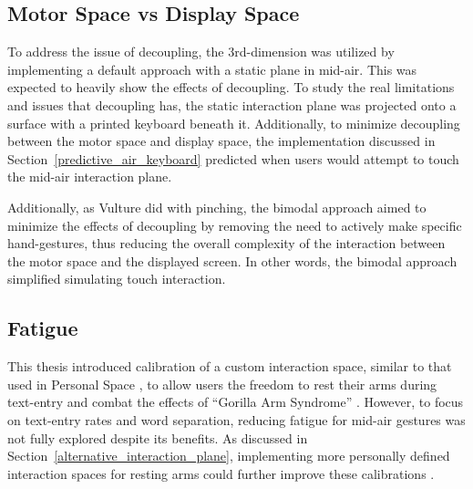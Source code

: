 \subsection{Motor Space vs Display Space}
To address the issue of decoupling, the 3rd-dimension was utilized by implementing a default approach with a static plane in mid-air. This was expected to heavily show the effects of decoupling. To study the real limitations and issues that decoupling has, the static interaction plane was projected onto a surface with a printed keyboard beneath it. Additionally, to minimize decoupling between the motor space and display space, the implementation discussed in Section~\ref{predictive_air_keyboard} predicted when users would attempt to touch the mid-air interaction plane.

Additionally, as Vulture did with pinching, the bimodal approach aimed to minimize the effects of decoupling by removing the need to actively make specific hand-gestures, thus reducing the overall complexity of the interaction between the motor space and the displayed screen. In other words, the bimodal approach simplified simulating touch interaction.

\subsection{Fatigue} \label{gorilla_arm_syndrome}
This thesis introduced calibration of a custom interaction space, similar to that used in Personal Space \cite{ref_alvin_thesis}, to allow users the freedom to rest their arms during text-entry and combat the effects of ``Gorilla Arm Syndrome'' \cite{ref_darren_thesis,ref_gorilla_arm,ref_natural_relaxed_gestures,ref_SEATO_layout_2}. However, to focus on text-entry rates and word separation, reducing fatigue for mid-air gestures was not fully explored despite its benefits. As discussed in Section~\ref{alternative_interaction_plane}, implementing more personally defined interaction spaces for resting arms could further improve these calibrations \cite{ref_alvin_thesis,ref_darren_thesis}.